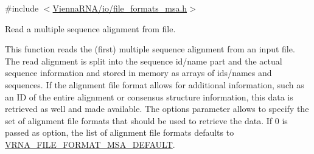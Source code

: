{\ttfamily \#include $<$\mbox{\hyperlink{io_2file__formats__msa_8h}{Vienna\+R\+N\+A/io/file\+\_\+formats\+\_\+msa.\+h}}$>$}



Read a multiple sequence alignment from file. 

This function reads the (first) multiple sequence alignment from an input file. The read alignment is split into the sequence id/name part and the actual sequence information and stored in memory as arrays of ids/names and sequences. If the alignment file format allows for additional information, such as an ID of the entire alignment or consensus structure information, this data is retrieved as well and made available. The {\ttfamily options} parameter allows to specify the set of alignment file formats that should be used to retrieve the data. If 0 is passed as option, the list of alignment file formats defaults to \mbox{\hyperlink{group__file__formats__msa_ga4acc255373831856a8417b68de8a94c0}{V\+R\+N\+A\+\_\+\+F\+I\+L\+E\+\_\+\+F\+O\+R\+M\+A\+T\+\_\+\+M\+S\+A\+\_\+\+D\+E\+F\+A\+U\+LT}}.

